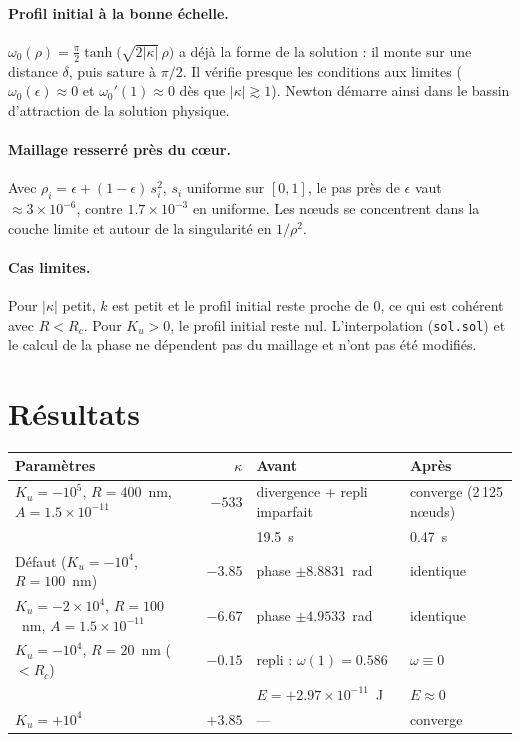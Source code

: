 \documentclass[11pt,a4paper]{article}
\begin{document}
\paragraph{Profil initial à la bonne échelle.}
$\omega_0(\rho) = \frac{\pi}{2}\tanh\!\big(\sqrt{2|\kappa|}\,\rho\big)$
a déjà la forme de la solution : il monte sur une distance $\delta$, puis
sature à $\pi/2$. Il vérifie presque les conditions aux limites
($\omega_0(\epsilon)\approx0$ et $\omega_0'(1)\approx0$ dès que
$|\kappa|\gtrsim 1$). Newton démarre ainsi dans le bassin d'attraction de la
solution physique.

\paragraph{Maillage resserré près du cœur.}
Avec $\rho_i = \epsilon + (1-\epsilon)\,s_i^{2}$, $s_i$ uniforme sur $[0,1]$,
le pas près de $\epsilon$ vaut $\approx 3\times10^{-6}$, contre
$1.7\times10^{-3}$ en uniforme. Les nœuds se concentrent dans la couche
limite et autour de la singularité en $1/\rho^{2}$.

\paragraph{Cas limites.}
Pour $|\kappa|$ petit, $k$ est petit et le profil initial reste proche de
$0$, ce qui est cohérent avec $R<R_c$. Pour $K_u>0$, le profil initial reste
nul. L'interpolation (\texttt{sol.sol}) et le calcul de la phase ne
dépendent pas du maillage et n'ont pas été modifiés.

\section{Résultats}

\begin{center}
\begin{tabular}{@{}lrll@{}}
\toprule
Paramètres & $\kappa$ & Avant & Après \\
\midrule
$K_u=-10^{5}$, $R=400$~nm, $A=1.5\times10^{-11}$ & $-533$
  & divergence + repli imparfait & converge (2\,125 nœuds) \\
  & & 19.5~s & 0.47~s \\
Défaut ($K_u=-10^{4}$, $R=100$~nm) & $-3.85$
  & phase $\pm 8.8831$~rad & identique \\
$K_u=-2\times10^{4}$, $R=100$~nm, $A=1.5\times10^{-11}$ & $-6.67$
  & phase $\pm 4.9533$~rad & identique \\
$K_u=-10^{4}$, $R=20$~nm ($<R_c$) & $-0.15$
  & repli : $\omega(1)=0.586$ & $\omega\equiv0$ \\
  & & $E=+2.97\times10^{-11}$~J & $E\approx0$ \\
$K_u=+10^{4}$ & $+3.85$ & --- & converge \\
\bottomrule
\end{tabular}
\end{center}
\end{document}

